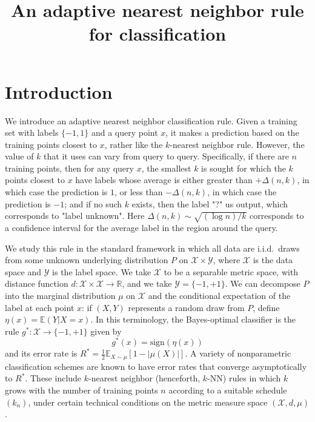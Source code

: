 \documentclass{article}
\title{An adaptive nearest neighbor rule for classification}
\def\R{{\mathbb{R}}}
\def\E{{\mathbb E}}
\def\X{{\mathcal X}}
\def\Y{{\mathcal Y}}
\newcommand{\sign}{\mbox{sign}}
\newcommand{\comment}[3]{}  %
\newcommand{\shay}[1]{\comment{purple}{Shay}{#1}}
\newcommand{\yoav}[1]{\comment{green}{Yoav}{#1}}
\begin{document}
\maketitle

\section{Introduction}

We introduce an adaptive nearest neighbor classification rule. Given a
training set with labels $\{-1,1\}$ and a query point $x$, it makes a
prediction based on the training points closest to $x$, rather like
the $k$-nearest neighbor rule. However, the value of $k$ that it uses
can vary from query to query. Specifically, if there are $n$ training
points, then for any query $x$, the smallest $k$ is sought for which
the $k$ points closest to $x$ have labels whose average is either
greater than $+\Delta(n,k)$, in which case the prediction is $1$, or
less than $- \Delta(n,k)$, in which case the prediction is $-1$; and
if no such $k$ exists, then the label "?" us output, which corresponds
to "label unknown".  Here $\Delta(n,k) \sim \sqrt{(\log n)/k}$
corresponds to a confidence interval for the average label in the
region around the query.

We study this rule in the standard framework in which all data are
i.i.d.\ draws from some unknown underlying distribution $P$ on $\X
\times \Y$, where $\X$ is the data space and $\Y$ is the label
space. We take $\X$ to be a separable metric space, with distance
function $d: \X \times \X \rightarrow \R$, and we take $\Y =
\{-1,+1\}$.  \yoav{We have two variants. The one described here, which
  only assumes a metric space, and the one in which we assume a
  euclidean space. The first is more general, the second is needed for
  active learning. I suggest we write the paper for case 1, and add a
  section at the end regarding case 2.}  \shay{Note that in the second
  one, where we assume a low VC dimension of the entire family of
  balls also allow for a faster rate (I believe that the assumptions
  we pick will yield a logarithmic rate in $1/\delta$). Therefore, if
  we also wish to discuss rates of convergence in this paper then we
  should consider including it.}  We can decompose $P$ into the
marginal distribution $\mu$ on $\X$ and the conditional expectation of
the label at each point $x$: if $(X,Y)$ represents a random draw from
$P$, define $\eta(x) = \E(Y| X = x)$. In this terminology, the
Bayes-optimal classifier is the rule $g^*: \X \rightarrow \{-1,+1\}$
given by
$$ g^*(x) = \sign(\eta(x)) $$
and its error rate is $R^* = \frac{1}{2}\E_{X \sim \mu} \left[1-|\mu(X)| \right]$. A variety of nonparametric classification schemes are known to have error rates that converge asymptotically to $R^*$. These include $k$-nearest neighbor (henceforth, $k$-NN) rules in which $k$ grows with the number of training points $n$ according to a suitable schedule $(k_n)$, under certain technical conditions on the metric measure space $(\X, d, \mu)$.
\end{document}
